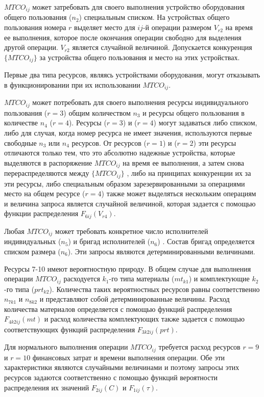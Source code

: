$MTCO_{ij}$ может затребовать для своего выполнения устройство оборудования общего пользования ($n_2$) специальным списком. На устройствах общего пользования номера $r$ выделяет место для  $ij$-й операции размером $V_{r2}$ на время ее выполнения, которое после окончания операции свободно для выделения другой операции. $V_{r2}$ является случайной величиной. Допускается конкуренция  $\big\{MTCO_{ij}\big\}$ за устройства общего пользования и место на этих устройствах.

Первые два типа ресурсов, являясь устройствами оборудования, могут отказывать в функционировании при их использовании $MTCO_{ij}$.

$MTCO_{ij}$ может потребовать для своего выполнения ресурсы индивидуального пользования ($r=3$) общим количеством $n_3$ и ресурсы общего пользования  в количестве $n_4$ ($r=4$). Ресурсы ($r=3$) и  ($r=4$) могут задаваться либо списком, либо для случая, когда номер ресурса не имеет значения, используются первые свободные $n_3$ или $n_4$ ресурсов.
От ресурсов ($r=1$) и ($r=2$) эти ресурсы отличаются только тем, что это абсолютно надежные устройства, которые выделяются в распоряжение $MTCO_{ij}$ на время ее выполнения, а затем снова перераспределяются между $\big\{MTCO_{ij}\big\}$ , либо на принципах конкуренции их за эти ресурсы, либо специальным образом зарезервированными за операциями место на общем ресурсе ($r=4$) также может выделяться нескольким операциям  и величина запроса является случайной величиной, которая задается с помощью функции распределения $F_{6ij}(V_{r4})$.

Любая $MTCO_{ij}$ может требовать конкретное число исполнителей индивидуальных ($n_5$)  и бригад исполнителей ($n_6$) . Состав бригад определяется списком размера ($n_6$). Эти запросы являются детерминированными величинами.

Ресурсы 7-10 имеют вероятностную природу. В общем случае для выполнения операции  $MTCO_{ij}$ расходуется $k_1$-го типа материалы ($mt_{k1}$) и комплектующие $k_2$-го типа ($prt_{k2}$). Количества таких вероятностных ресурсов равны соответственно $n_{7k1}$ и $n_{8k2}$ и представляют собой детерминированные величины.
Расход количества материалов определяется с помощью функций распределения $F_{4k2ij}(mt)$ и расход количества комплектующих также задается с помощью соответствующих функций распределения $F_{3k2ij}(prt)$.

Для нормального выполнения операции $MTCO_{ij}$ требуется расход ресурсов $r=9$ и $r=10$ финансовых затрат и времени выполнения операции. Обе эти характеристики являются случайными величинами  и поэтому запросы этих ресурсов задаются соответственно с помощью функций вероятности распределения их значений $F_{2ij}(C)$  и $F_{1ij}( \tau )$.


